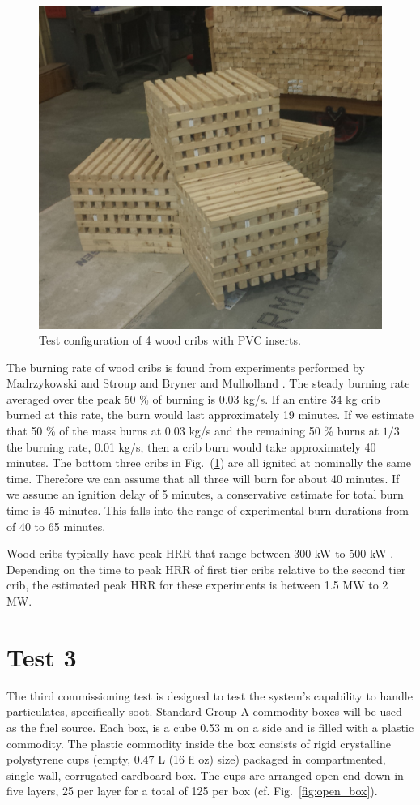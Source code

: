 \documentclass[12pt,oneside]{book}
\begin{document}
\begin{figure}
\centering
\includegraphics[width=.7\textwidth]{../Figures/cribs}
\caption {Test configuration of 4 wood cribs with PVC inserts.}
\label{fig:test_crib}
\end{figure}

The burning rate of wood cribs is found from experiments performed by Madrzykowski and Stroup \cite{Madrzykowski1998} and Bryner and Mulholland \cite{Bryner1991}. The steady burning rate averaged over the peak 50 \% of burning is 0.03 kg/s. If an entire 34 kg crib burned at this rate, the burn would last approximately 19 minutes. If we estimate that 50 \% of the mass burns at 0.03 kg/s and the remaining 50 \% burns at $1/3$ the burning rate, 0.01 kg/s, then a crib burn would take approximately 40 minutes. The bottom three cribs in Fig.~(\ref{fig:test_crib}) are all ignited at nominally the same time. Therefore we can assume that all three will burn for about 40 minutes. If we assume an ignition delay of 5 minutes, a conservative estimate for total burn time is 45 minutes. This falls into the range of experimental burn durations from \cite{Bryner1991} of 40 to 65 minutes.

Wood cribs typically have peak HRR that range between 300 kW to 500 kW \cite{Madrzykowski1998,Bryner1991}. Depending on the time to peak HRR of first tier cribs relative to the second tier crib, the estimated peak HRR for these experiments is between 1.5 MW to 2 MW. 

\section{Test 3}
\label{test3}
The third commissioning test is designed to test the system's capability to handle particulates, specifically soot. Standard Group A commodity boxes will be used as the fuel source. Each box, is a cube 0.53 m on a side and is filled with a plastic commodity. The plastic commodity inside the box consists of rigid crystalline polystyrene cups (empty, 0.47 L (16 fl oz) size) packaged in compartmented, single-wall, corrugated cardboard box. The cups are arranged open end down in five layers, 25 per layer for a total of 125 per box (cf. Fig.~\ref{fig:open_box}).
\end{document}
